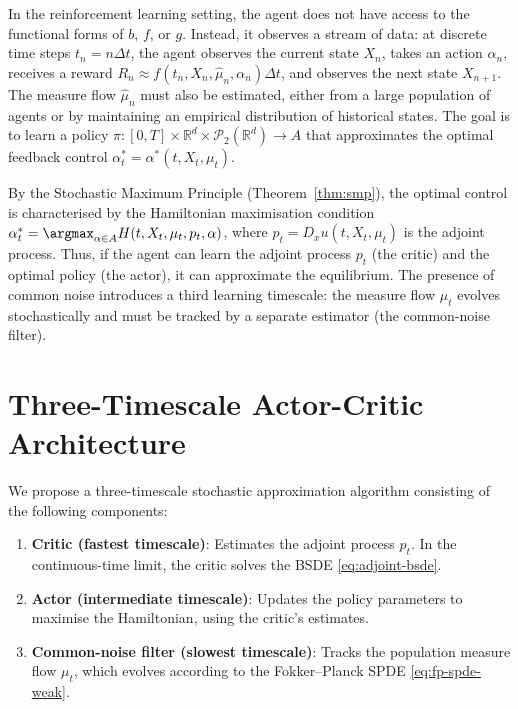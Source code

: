 In the reinforcement learning setting, the agent does not have access to the
functional forms of $b$, $f$, or $g$. Instead, it observes a stream of data: at
discrete time steps $t_n = n\Delta t$, the agent observes the current state $X_n$,
takes an action $\alpha_n$, receives a reward
$R_n \approx f(t_n, X_n, \hat\mu_n, \alpha_n)\Delta t$, and observes the next state
$X_{n+1}$. The measure flow $\hat\mu_n$ must also be estimated, either from a large
population of agents or by maintaining an empirical distribution of historical
states. The goal is to learn a policy
$\pi : [0,T] \times \mathbb{R}^d \times \mathcal{P}_2(\mathbb{R}^d) \to A$ that
approximates the optimal feedback control $\alpha_t^* = \alpha^*(t, X_t, \mu_t)$.

By the Stochastic Maximum Principle (Theorem~\ref{thm:smp}), the optimal control is
characterised by the Hamiltonian maximisation condition
$\alpha_t^* = \argmax_{\alpha \in A} H(t, X_t, \mu_t, p_t, \alpha)$, where
$p_t = D_x u(t, X_t, \mu_t)$ is the adjoint process. Thus, if the agent can learn the
adjoint process $p_t$ (the critic) and the optimal policy (the actor), it can
approximate the equilibrium. The presence of common noise introduces a third
learning timescale: the measure flow $\mu_t$ evolves stochastically and must be
tracked by a separate estimator (the common-noise filter).


\section{Three-Timescale Actor-Critic Architecture}
\label{sec:rl-architecture}

We propose a three-timescale stochastic approximation algorithm consisting of the
following components:

\begin{enumerate}
    \item \textbf{Critic (fastest timescale)}: Estimates the adjoint process $p_t$.
    In the continuous-time limit, the critic solves the BSDE \eqref{eq:adjoint-bsde}.
    \item \textbf{Actor (intermediate timescale)}: Updates the policy parameters to
    maximise the Hamiltonian, using the critic's estimates.
    \item \textbf{Common-noise filter (slowest timescale)}: Tracks the population
    measure flow $\mu_t$, which evolves according to the Fokker--Planck SPDE
    \eqref{eq:fp-spde-weak}.
\end{enumerate}

